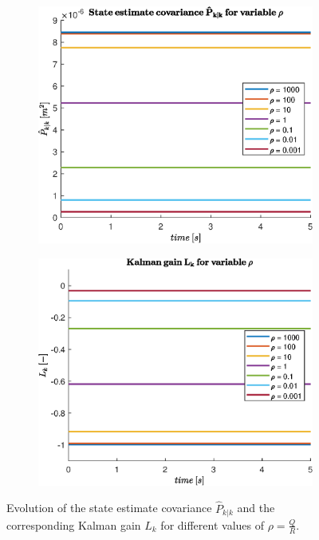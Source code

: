 \documentclass[a4paper,kul]{kulakarticle} %
\begin{document}
\begin{figure}[htp!]
	\centering
	\begin{subfigure}[b]{0.48\textwidth}
		\centering
		\includegraphics[width=\textwidth]{phat.eps}
	\end{subfigure}
	\hfill
	\begin{subfigure}[b]{0.48\textwidth}  
		\centering 
		\includegraphics[width=\textwidth]{L.eps}
	\end{subfigure}
	\caption{Evolution of the state estimate covariance $\hat{P}_{k|k}$ and the corresponding Kalman gain $L_k$ for different values of $\rho = \frac{Q}{R}$.} 
	\label{fig:variable_rho}
\end{figure}
\end{document}
